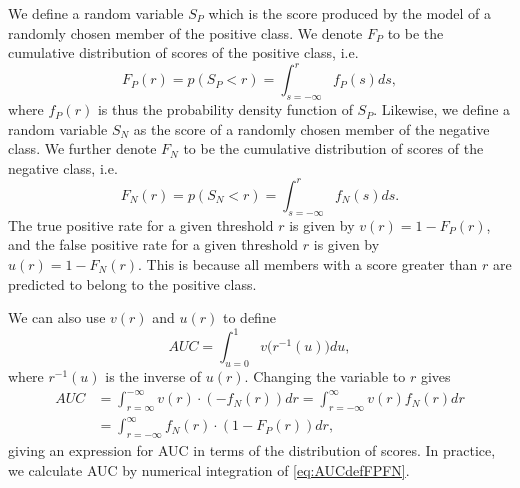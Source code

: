 We define a random variable $S_P$ which is the score produced by the model of a randomly chosen member of the positive class. We denote $F_P$ to be the cumulative distribution of scores of the positive class, i.e.
\begin{equation}
F_P(r) = p(S_P < r) = \int_{s=-\infty}^{r} f_P(s) ds, \label{eq:ScorefPr}
\end{equation}
where $f_P(r)$ is thus the probability density function of  $S_P$. %
Likewise, we define a random variable $S_N$ as the score of a randomly chosen member of the negative class. We further denote $F_N$ to be the cumulative distribution of scores of the negative class, i.e.
\begin{equation}
F_N(r) = p(S_N < r) = \int_{s=-\infty}^{r} f_N(s)ds. \label{eq:ScorenPr}
\end{equation}
The true positive rate for a given threshold $r$ is given by $v(r)=1-F_P(r)$, and the false positive rate for a given threshold $r$ is given by $u(r)=1-F_N(r)$. This is because all members with a score greater than $r$ are predicted to belong to the positive class.

We can also use $v(r)$ and $u(r)$ to define
\begin{equation}
AUC  = \int_{u=0}^{1} v \big( r^{-1}(u) \big) du,  \label{eq:AUCdef}
\end{equation}
where $r^{-1}(u)$ is the inverse of $u(r)$. Changing the variable to $r$ gives
\begin{align}
AUC & =  \int_{r=\infty}^{-\infty} v(r) \cdot (- f_N(r)) dr =  \int_{r=-\infty}^{\infty} v(r) f_N(r) dr  \nonumber\\
& =  \int_{r=-\infty}^{\infty} f_N(r) \cdot  \left(1 - F_P(r)\right)  dr, \label{eq:AUCdefFPFN}
\end{align}
giving an expression for AUC in terms of the distribution of scores. In practice, we calculate AUC by numerical integration of \eqref{eq:AUCdefFPFN}.%

